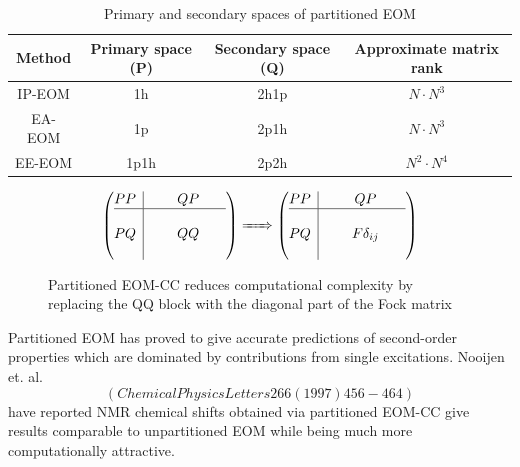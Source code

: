 \begin{table}[htb]
\centering
\begin{tabular}{c|c|c|c}
\centering
Method & Primary space (P) & Secondary space (Q) & Approximate matrix rank\\
\hline
IP-EOM & 1h & 2h1p  & $N \cdot N^3$\\
EA-EOM & 1p & 2p1h& $N \cdot N^3$\\
EE-EOM & 1p1h & 2p2h &$N^2 \cdot N^4$\\
\end{tabular}
\caption{Primary and secondary spaces of partitioned EOM}
\label{table:PQspace}
\end{table}

\begin{figure}[h]
\[
\left(\begin{array}{@{}c|c@{}}
  PP
  & QP \\
\hline PQ &
\begin{matrix}
\phantom{X}&\phantom{X}&\phantom{X}\\
\phantom{X}&QQ&\phantom{X}\\
\phantom{X}&\phantom{X}&\phantom{X} 
\end{matrix}
\end{array}\right)
\xRightarrow{\hspace{5mm}}
\left(\begin{array}{@{}c|c@{}}
  PP &QP\\
\hline
 PQ &\begin{matrix}
\phantom{X}&\phantom{X}&\phantom{X}\\
\phantom{X}&F \delta_{ij} &\phantom{X}\\
\phantom{X}&\phantom{X}&\phantom{X}
\end{matrix}
\end{array}\right)
\]
\caption{Partitioned EOM-CC reduces computational complexity by replacing the QQ block with the diagonal part of the Fock matrix}
\label{fig:partitioned-EOM}
\end{figure}

Partitioned EOM has proved to give accurate predictions of second-order properties which are dominated by contributions from single excitations. Nooijen et. al. 
\begin{equation}(Chemical Physics Letters 266 (1997) 456-464) 
\end{equation}
have reported NMR chemical 
shifts obtained via partitioned EOM-CC give results comparable to unpartitioned EOM while being much more computationally attractive.\\

